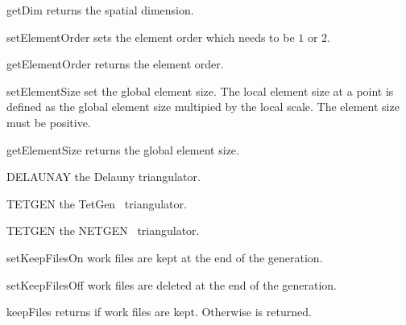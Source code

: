 \begin{methoddesc}[Design]{getDim}{}
returns the spatial dimension.
\end{methoddesc}

\begin{methoddesc}[Design]{setElementOrder}{}
sets the element order which needs to be $1$ or $2$.
\end{methoddesc}

\begin{methoddesc}[Design]{getElementOrder}{}
returns the element order.
\end{methoddesc}


\begin{methoddesc}[Design]{setElementSize}{}
set the global element size. The local element size at a point is defined as 
the global element size multipied by the local scale. The element size must be positive.
\end{methoddesc}


\begin{methoddesc}[Design]{getElementSize}{}
returns the global element size.
\end{methoddesc}

\begin{memberdesc}[Design]{DELAUNAY}
the \gmshextern Delauny triangulator.
\end{memberdesc}

\begin{memberdesc}[Design]{TETGEN}
the TetGen~\cite{TETGEN} triangulator.
\end{memberdesc}

\begin{memberdesc}[Design]{TETGEN}
the NETGEN~\cite{NETGEN} triangulator.
\end{memberdesc}

\begin{methoddesc}[Design]{setKeepFilesOn}{}
work files are kept at the end of the generation.
\end{methoddesc}

\begin{methoddesc}[Design]{setKeepFilesOff}{}
work files are deleted at the end of the generation.
\end{methoddesc}

\begin{methoddesc}[Design]{keepFiles}{}
returns \True if work files are kept. Otherwise \False is returned.
\end{methoddesc}

